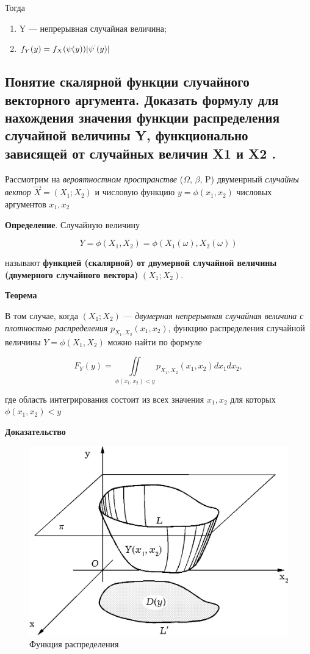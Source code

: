Тогда

\begin{enumerate}
	\item Y --- непрерывная случайная величина;
	\item $f_Y(y) = f_X(\psi(y))|\psi^`(y)|$
\end{enumerate}

\subsection{Понятие скалярной функции случайного векторного аргумента. Доказать формулу для нахождения значения функции распределения случайной величины Y, функционально зависящей от случайных величин X1 и X2 .}

Рассмотрим на \textit{вероятностном пространстве} ($\Omega$, $\beta$, P) двуменрный \textit{случайны вектор} $\overrightarrow{X} = (X_1; X_2)$ и числовую функцию $y = \phi(x_1, x_2)$ числовых аргументов $x_1, x_2$

\textbf{Определение}. Случайную величину

\begin{equation}
	\label{stroganov-pidoras}
	Y = \phi(X_1, X_2) = \phi(X_1(\omega), X_2(\omega))
\end{equation}

называют \textbf{функцией (скалярной) от двумерной случайной величины (двумерного случайного вектора)} $(X_1;X_2)$.

\textbf{Теорема}

В том случае, когда $(X_1; X_2)$ --- \textit{двумерная непрерывная случайная величина с плотностью распределения} $p_{X_1, X_2}(x_1, x_2)$, функцию распределения случайной величины $Y = \phi(X_1, X_2)$ можно найти по формуле

\begin{equation}
	\label{jopa2}
	F_Y(y) = \iint\limits_{\phi(x_1, x_2) < y} p_{X_1, X_2}(x_1, x_2)dx_1dx_2, 
\end{equation}


где область интегрирования состоит из всех значения $x_1, x_2$ для которых $\phi(x_1, x_2) < y$

\textbf{Доказательство}

\begin{figure}[ht!]
	\centering
	\includegraphics[width=0.6\linewidth]{assets/jopa-geom.png}
	\caption{Функция распределения}
	\label{fig:alg}
\end{figure}

